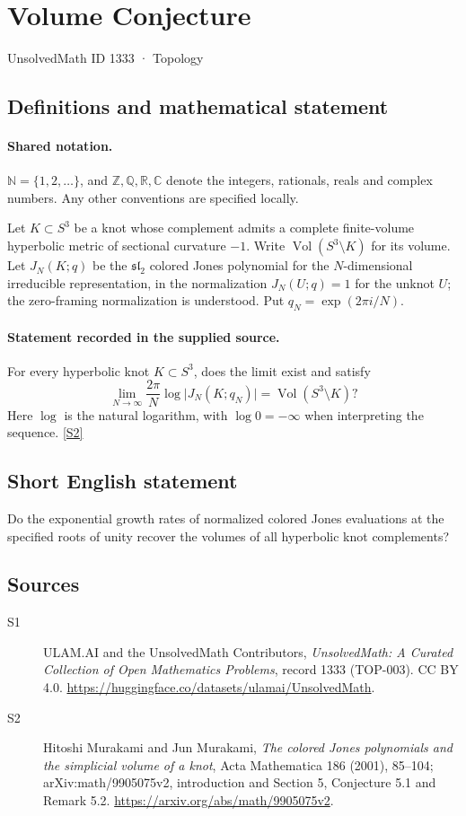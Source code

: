 \documentclass[11pt]{article}
\newcommand{\sref}[2]{\hyperlink{source:#1:#2}{[S#2]}}
\begin{document}
\setcounter{section}{1332}
\section{Volume Conjecture}\label{1333}
{\small\sffamily UnsolvedMath ID 1333 · Topology}
\subsection{Definitions and mathematical statement}

\paragraph{Shared notation.}$\mathbb N=\{1,2,\ldots\}$, and $\mathbb Z,\mathbb Q,\mathbb R,\mathbb C$ denote the integers, rationals, reals and complex numbers. Any other conventions are specified locally.


Let $K\subset S^3$ be a knot whose complement admits a complete finite-volume hyperbolic metric of sectional curvature $-1$. Write $\operatorname{Vol}(S^3\setminus K)$ for its volume. Let $J_N(K;q)$ be the $\mathfrak{sl}_2$ colored Jones polynomial for the $N$-dimensional irreducible representation, in the normalization $J_N(U;q)=1$ for the unknot $U$; the zero-framing normalization is understood. Put $q_N=\exp(2\pi i/N)$.
\paragraph{Statement recorded in the supplied source.}
For every hyperbolic knot $K\subset S^3$, does the limit exist and satisfy
\[
 \lim_{N\to\infty}\frac{2\pi}{N}\log\bigl|J_N(K;q_N)\bigr|
 =\operatorname{Vol}(S^3\setminus K)?
\]
Here $\log$ is the natural logarithm, with $\log 0=-\infty$ when interpreting the sequence. \sref{1333}{2}
\subsection{Short English statement}
Do the exponential growth rates of normalized colored Jones evaluations at the specified roots of unity recover the volumes of all hyperbolic knot complements?
\subsection{Sources}
\begin{description}
\item[\hypertarget{source:1333:1}{S1}] ULAM.AI and the UnsolvedMath Contributors, \emph{UnsolvedMath: A Curated Collection of Open Mathematics Problems}, record 1333 (TOP-003). CC BY 4.0. \url{https://huggingface.co/datasets/ulamai/UnsolvedMath}.
\item[\hypertarget{source:1333:2}{S2}] Hitoshi Murakami and Jun Murakami, \emph{The colored Jones polynomials and the simplicial volume of a knot}, Acta Mathematica 186 (2001), 85--104; arXiv:math/9905075v2, introduction and Section 5, Conjecture 5.1 and Remark 5.2. \url{https://arxiv.org/abs/math/9905075v2}.
\end{description}
\label{end:1333}
\end{document}
